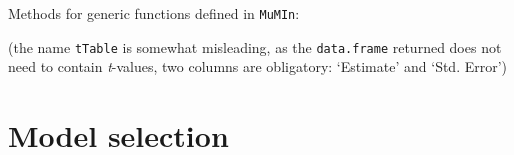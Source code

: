 \documentclass{article}
\newcommand{\code}[1]{{\tt #1}}
\newcommand{\pkg}[1]{{\tt #1}}
\newcommand{\sQuote}[1]{{`#1'}}
\begin{document}
Methods for generic functions defined in \pkg{MuMIn}:
\begin{Schunk}
\end{Schunk}
(the name \code{tTable} is somewhat misleading, as the \code{data.frame} 
returned does not need to contain \emph{t}-values, two columns are obligatory:
\sQuote{Estimate} and \sQuote{Std. Error})

\section{Model selection}
\end{document}
